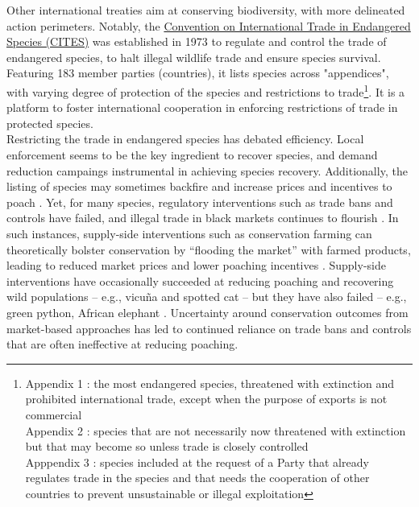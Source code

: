 Other international treaties aim at conserving biodiversity, with more delineated action perimeters. Notably, the \href{https://cites.org/fra}{Convention on International Trade in Endangered Species (CITES)} was established in 1973 to regulate and control the trade of endangered species, to halt illegal wildlife trade and ensure species survival. Featuring 183 member parties (countries), it lists species across "appendices", with varying degree of protection of the species and restrictions to trade\footnote{Appendix 1 : the most endangered species, threatened with extinction and prohibited international trade, except when the purpose of exports is not commercial\\
Appendix 2 : species that are not necessarily now threatened with extinction but that may become so unless trade is closely controlled\\
Apppendix 3 : species included at the request of a Party that already regulates trade in the species and that needs the cooperation of other countries to prevent unsustainable or illegal exploitation}. It is a platform to foster international cooperation in enforcing restrictions of trade in protected species.
\\
Restricting the trade in endangered species has debated efficiency. Local enforcement seems to be the key ingredient \citep{HEID2023102784} to recover species, and demand reduction campaings instrumental in achieving species recovery. Additionally, the listing of species may sometimes backfire and increase prices and incentives to poach \citep{hsiang_does_2016}. Yet, for many species, regulatory interventions such as trade bans and controls have failed, and illegal trade in black markets continues to flourish \citep{challender_poaching_2014, challender_towards_2015}. In such instances, supply-side interventions such as conservation farming can theoretically bolster conservation by “flooding the market” with farmed products, leading to reduced market prices and lower poaching incentives \citep{gentry_looking_2019, phelps_framework_2014, tensen_under_2016}. Supply-side interventions have occasionally succeeded at reducing poaching and recovering wild populations – e.g., vicuña and spotted cat \citep{iucn_world_2000, sahley_biological_2007} – but they have also failed – e.g., green python, African elephant \citep{lyons_wildlife_2011, hsiang_does_2016}. Uncertainty around conservation outcomes from market-based approaches has led to continued reliance on trade bans and controls that are often ineffective at reducing poaching.\\

